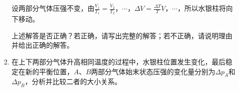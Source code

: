 \begin{enumerate}[leftmargin=0em]
\begin{enumerate}
设两部分气体压强不变，由$\frac { V _ { 1 } } { T _ { 1 } } = \frac { V _ { 2 } } { T _ { 2 } }$，$ \cdots $，$\Delta V = \frac { \Delta T } { T } V$，$ \cdots $，所以水银柱将向下移动。

上述解答是否正确？若正确，请写出完整的解答；若不正确，请说明理由并给出正确的解答。
\item 
在上下两部分气体升高相同温度的过程中，水银柱位置发生变化，最后稳定在新的平衡位置，$ A $、$ B $两部分气体始末状态压强的变化量分别为$ \Delta p_{A} $和$ \Delta p_{B} $，分析并比较二者的大小关系。


\end{enumerate}


\begin{minipage}[h!]{0.7\linewidth}
\vspace{0.3em}

\vspace{0.3em}
\end{minipage}
\hfill
\begin{minipage}[h!]{0.3\linewidth}
\flushright
\vspace{0.3em}

\vspace{0.3em}
\end{minipage}







\end{enumerate}

